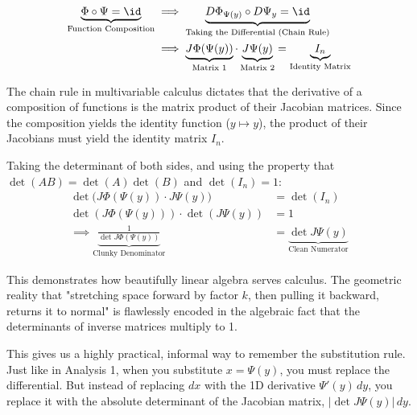 \begin{math_stroke}
\begin{align*}
\underbrace{\Phi \circ \Psi = \id}_{\text{Function Composition}} &\implies \underbrace{D\Phi_{\Psi(y)} \circ D\Psi_y = \id}_{\text{Taking the Differential (Chain Rule)}} \\
&\implies \underbrace{J\Phi(\Psi(y))}_{\text{Matrix 1}} \cdot \underbrace{J\Psi(y)}_{\text{Matrix 2}} = \underbrace{I_n}_{\text{Identity Matrix}}
\end{align*}

\begin{explanation-of-steps}
The chain rule in multivariable calculus dictates that the derivative of a composition of functions is the matrix product of their Jacobian matrices. Since the composition yields the identity function ($y \mapsto y$), the product of their Jacobians must yield the identity matrix $I_n$. 
\end{explanation-of-steps}


Taking the determinant of both sides, and using the property that $\det(AB) = \det(A)\det(B)$ and $\det(I_n) = 1$:
\begin{align*}
\det\Big( J\Phi(\Psi(y)) \cdot J\Psi(y) \Big) &= \det(I_n) \\
\det(J\Phi(\Psi(y))) \cdot \det(J\Psi(y)) &= 1 \\
\implies \underbrace{\frac{1}{\det J\Phi(\Psi(y))}}_{\text{Clunky Denominator}} &= \underbrace{\det J\Psi(y)}_{\text{Clean Numerator}}
\end{align*}
\end{math_stroke}

\begin{didactic_insight}
This demonstrates how beautifully linear algebra serves calculus. The geometric reality that "stretching space forward by factor $k$, then pulling it backward, returns it to normal" is flawlessly encoded in the algebraic fact that the determinants of inverse matrices multiply to 1.
\end{didactic_insight}

\begin{spoken_clean}[00:10:45 - 00:12:15]
This gives us a highly practical, informal way to remember the substitution rule. Just like in Analysis 1, when you substitute $x = \Psi(y)$, you must replace the differential. But instead of replacing $dx$ with the 1D derivative $\Psi'(y) \, dy$, you replace it with the absolute determinant of the Jacobian matrix, $|\det J\Psi(y)| \, dy$.
\end{spoken_clean}

